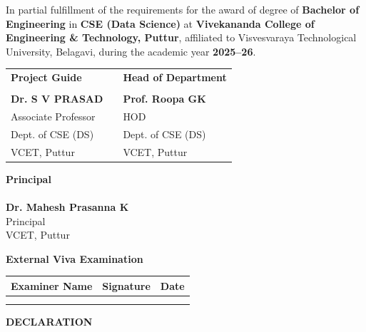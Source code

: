 \documentclass[12pt,a4paper]{report}
\begin{document}
In partial fulfillment of the requirements for the award of degree of \textbf{Bachelor of Engineering} in \textbf{CSE (Data Science)} at \textbf{Vivekananda College of Engineering \& Technology, Puttur}, affiliated to Visvesvaraya Technological University, Belagavi, during the academic year \textbf{2025--26}.

\vspace{1cm}
\begin{center}
\begin{tabular}{p{5cm} p{3cm} p{5cm}}
\textbf{Project Guide} & & \textbf{Head of Department} \\[30pt]
\underline{\hspace{4.5cm}} & & \underline{\hspace{4.5cm}} \\
\textbf{Dr. S V PRASAD} & & \textbf{Prof. Roopa GK} \\
Associate Professor & & HOD \\
Dept. of CSE (DS) & & Dept. of CSE (DS) \\
VCET, Puttur & & VCET, Puttur \\
\end{tabular}
\end{center}

\vspace{1cm}
\begin{center}
\textbf{Principal}\\[30pt]
\underline{\hspace{4.5cm}}\\
\textbf{Dr. Mahesh Prasanna K}\\
Principal\\
VCET, Puttur
\end{center}

\vspace{1cm}
\begin{center}
{\large\bfseries External Viva Examination}\\[10pt]
\begin{tabular}{|p{4cm}|p{4cm}|p{4cm}|}
\hline
\textbf{Examiner Name} & \textbf{Signature} & \textbf{Date} \\
\hline
& & \\[20pt]
& & \\
\hline
\end{tabular}
\end{center}

\newpage
\thispagestyle{plain}
\begin{center}
{\Large\bfseries DECLARATION}
\end{center}
\vspace{0.5cm}
\end{document}

